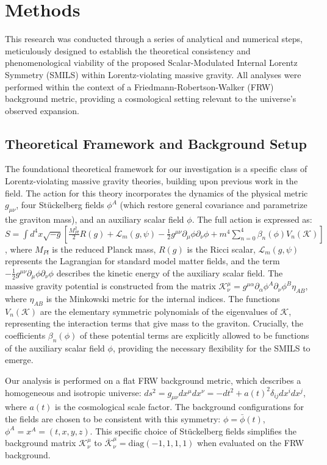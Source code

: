 \documentclass[twocolumn]{aastex631}
\begin{document}
\section{Methods}
\label{sec:methods}
This research was conducted through a series of analytical and numerical steps, meticulously designed to establish the theoretical consistency and phenomenological viability of the proposed Scalar-Modulated Internal Lorentz Symmetry (SMILS) within Lorentz-violating massive gravity. All analyses were performed within the context of a Friedmann-Robertson-Walker (FRW) background metric, providing a cosmological setting relevant to the universe's observed expansion.

\subsection{Theoretical Framework and Background Setup}
The foundational theoretical framework for our investigation is a specific class of Lorentz-violating massive gravity theories, building upon previous work in the field. The action for this theory incorporates the dynamics of the physical metric $g_{\mu\nu}$, four Stückelberg fields $\phi^A$ (which restore general covariance and parametrize the graviton mass), and an auxiliary scalar field $\phi$. The full action is expressed as:
$S = \int d^4x \sqrt{-g} \left[ \frac{M_{Pl}^2}{2} R(g) + \mathcal{L}_m(g, \psi) - \frac{1}{2}g^{\mu\nu}\partial_\mu\phi\partial_\nu\phi + m^4 \sum_{n=0}^4 \beta_n(\phi) V_n(\mathcal{K}) \right]$,
where $M_{Pl}$ is the reduced Planck mass, $R(g)$ is the Ricci scalar, $\mathcal{L}_m(g, \psi)$ represents the Lagrangian for standard model matter fields, and the term $-\frac{1}{2}g^{\mu\nu}\partial_\mu\phi\partial_\nu\phi$ describes the kinetic energy of the auxiliary scalar field. The massive gravity potential is constructed from the matrix $\mathcal{K}^\mu_\nu = g^{\mu\alpha} \partial_\alpha \phi^A \partial_\nu \phi^B \eta_{AB}$, where $\eta_{AB}$ is the Minkowski metric for the internal indices. The functions $V_n(\mathcal{K})$ are the elementary symmetric polynomials of the eigenvalues of $\mathcal{K}$, representing the interaction terms that give mass to the graviton. Crucially, the coefficients $\beta_n(\phi)$ of these potential terms are explicitly allowed to be functions of the auxiliary scalar field $\phi$, providing the necessary flexibility for the SMILS to emerge.

Our analysis is performed on a flat FRW background metric, which describes a homogeneous and isotropic universe:
$ds^2 = g_{\mu\nu}dx^\mu dx^\nu = -dt^2 + a(t)^2 \delta_{ij} dx^i dx^j$,
where $a(t)$ is the cosmological scale factor. The background configurations for the fields are chosen to be consistent with this symmetry:
$\phi = \bar{\phi}(t)$,
$\phi^A = x^A = (t, x, y, z)$.
This specific choice of Stückelberg fields simplifies the background matrix $\mathcal{K}^\mu_\nu$ to $\bar{\mathcal{K}}^\mu_\nu = \text{diag}(-1, 1, 1, 1)$ when evaluated on the FRW background.
\end{document}

